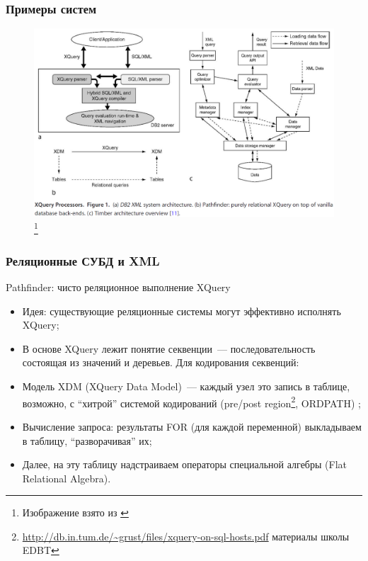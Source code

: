 \documentclass{beamer}
\begin{document}
\begin{frame}[t]
\frametitle{Примеры систем}

\begin{figure}[htb]
\includegraphics[width=\textwidth,height=0.77\textheight,keepaspectratio]{xml-approaches.png} 
\footnote{\tiny{Изображение взято из \cite{Grust2009}}}
\end{figure}    
  
\end{frame}

\begin{frame}
\frametitle{Реляционные СУБД и XML}
Pathfinder: чисто реляционное выполнение XQuery
\begin{itemize}
  \setlength\itemsep{1em}
  \item Идея: существующие реляционные системы могут эффективно исполнять XQuery;
  \item В основе XQuery лежит понятие секвенции~--- последовательность состоящая из значений и деревьев. Для кодирования секвенций:
  \item Модель XDM (XQuery Data Model)~--- каждый узел это запись в таблице, возможно, с ``хитрой'' системой кодирований (pre/post region\footnote{\url{http://db.in.tum.de/~grust/files/xquery-on-sql-hosts.pdf} материалы школы EDBT}, ORDPATH) \cite{Grust2009};
  \item Вычисление запроса: результаты FOR (для каждой переменной) выкладываем в таблицу, ``разворачивая'' их;
  \item Далее, на эту таблицу надстраиваем операторы специальной алгебры (Flat Relational Algebra).
\end{itemize}
\end{frame}
\end{document}
